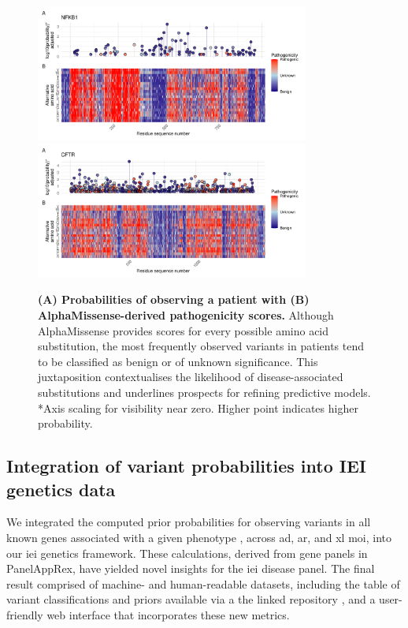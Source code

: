 \begin{figure}[ht]
\begin{center}
    \includegraphics[width=0.8\textwidth]{../images/p_alphamissense_NFKB1.pdf}
    \includegraphics[width=0.8\textwidth]{../images/p_alphamissense_CFTR.pdf}
\end{center}
\caption{\textbf{(A) Probabilities of observing a patient with (B) AlphaMissense-derived pathogenicity scores.} Although AlphaMissense provides scores for every possible amino acid substitution, the most frequently observed variants in patients tend to be classified as benign or of unknown significance. This juxtaposition contextualises the likelihood of disease-associated substitutions and underlines prospects for refining predictive models. *Axis scaling for visibility near zero. Higher point indicates higher probability.}
 \label{fig:alphamissense}
\end{figure}

\FloatBarrier
\subsection{Integration of variant probabilities into IEI genetics data}
We integrated the computed prior probabilities for observing variants in all known genes associated with a given phenotype \cite{poli_human_2025}, across \ac{ad}, \ac{ar}, and \ac{xl} \ac{moi}, into our \ac{iei} genetics framework. These calculations, derived from gene panels in PanelAppRex, have yielded novel insights for the \ac{iei} disease panel. The final result comprised of machine- and human-readable datasets, including the table of variant classifications and priors available via a the linked repository \cite{lawless_2025_15111584}, and a user-friendly web interface that incorporates these new metrics.

